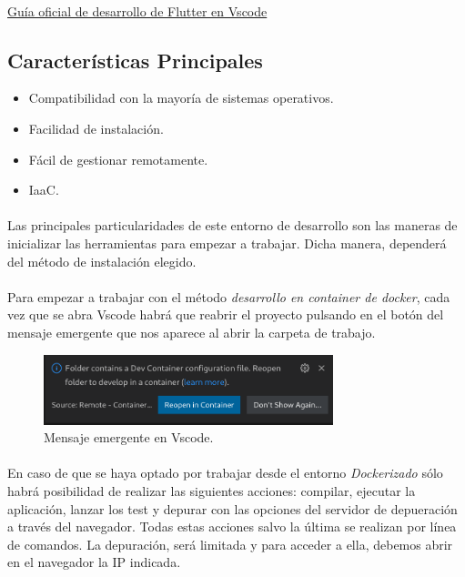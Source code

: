 \paragraph{}\href{https://esflutter.dev/docs/development/tools/vs-code}
{Guía oficial de desarrollo de Flutter en Vscode}

\subsection{Características Principales}

\begin{itemize}
    \item Compatibilidad con la mayoría de sistemas operativos.
    \item Facilidad de instalación.
    \item Fácil de gestionar remotamente.
    \item \gls{IaaC}.
\end{itemize}

\paragraph{}Las principales particularidades de este entorno de desarrollo son las
maneras de inicializar las herramientas para empezar a trabajar. Dicha manera, dependerá
del método de instalación elegido.

\paragraph{}Para empezar a trabajar con el método \emph{desarrollo en container de docker},
cada vez que se abra Vscode habrá que reabrir el proyecto pulsando en el botón del mensaje
emergente que nos aparece al abrir la carpeta de trabajo.

\begin{figure}[H]
    \centering
    \includegraphics[width=0.75\textwidth]{imgs/dev-container}
    \caption[Mensaje emergente en Vscode]{Mensaje emergente en Vscode.}
    \label{imgs:vscode-devcontainer-2}
\end{figure}

\paragraph{}En caso de que se haya optado por trabajar desde el entorno \emph{Dockerizado}
sólo habrá posibilidad de realizar las siguientes acciones: compilar, ejecutar la aplicación,
lanzar los test y depurar con las opciones del servidor de depueración a través del navegador.
Todas estas acciones salvo la última se realizan por línea de comandos. La depuración,
será limitada y para acceder a ella, debemos abrir en el navegador la IP indicada.

